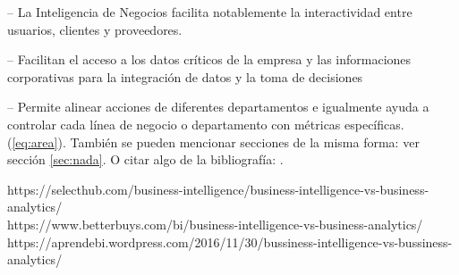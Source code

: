  – La Inteligencia de Negocios facilita notablemente la interactividad entre usuarios, clientes y proveedores.

 – Facilitan el acceso a los datos críticos de la empresa y las informaciones corporativas para la integración de datos y la toma de decisiones

 – Permite alinear acciones de diferentes departamentos e igualmente ayuda a controlar cada línea de negocio o departamento con métricas específicas.
 \\

(\ref{eq:area}).
También se pueden mencionar secciones de la misma forma: ver sección
\ref{sec:nada}. O citar algo de la bibliografía: \cite{Cd94}.


\begin{thebibliography}{99}

 https://selecthub.com/business-intelligence/business-intelligence-vs-business-analytics/
\\
 https://www.betterbuys.com/bi/business-intelligence-vs-business-analytics/
\\
 https://aprendebi.wordpress.com/2016/11/30/bussiness-intelligence-vs-bussiness-analytics/
\\


\end{thebibliography}


